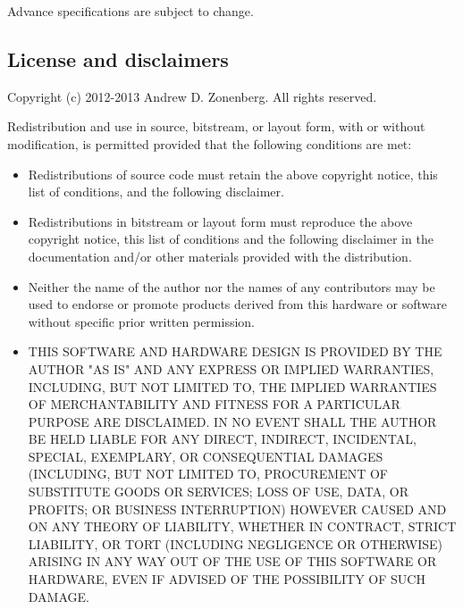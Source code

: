\documentclass{article}
\begin{document}
Advance specifications are subject to change.

\subsection{License and disclaimers}
                                                                                                                   
Copyright (c) 2012-2013 Andrew D. Zonenberg. All rights reserved.

Redistribution and use in source, bitstream, or layout form, with or without modification, is permitted
provided that the following conditions are met:

\begin{itemize}
\item Redistributions of source code must retain the above copyright notice, this list of conditions, and the following
disclaimer.

\item Redistributions in bitstream or layout form must reproduce the above copyright notice, this list of conditions and
the following disclaimer in the documentation and/or other materials provided with the distribution.

\item Neither the name of the author nor the names of any contributors may be used to endorse or promote products
derived from this hardware or software without specific prior written permission.

\item THIS SOFTWARE AND HARDWARE DESIGN IS PROVIDED BY THE AUTHOR "AS IS" AND ANY EXPRESS OR IMPLIED WARRANTIES, 
INCLUDING, BUT NOT LIMITED TO, THE IMPLIED WARRANTIES OF MERCHANTABILITY AND FITNESS FOR A PARTICULAR PURPOSE ARE 
DISCLAIMED. IN NO EVENT SHALL THE AUTHOR BE HELD LIABLE FOR ANY DIRECT, INDIRECT, INCIDENTAL, SPECIAL, EXEMPLARY, OR 
CONSEQUENTIAL DAMAGES (INCLUDING, BUT NOT LIMITED TO, PROCUREMENT OF SUBSTITUTE GOODS OR SERVICES; LOSS OF USE, 
DATA, OR PROFITS; OR BUSINESS INTERRUPTION) HOWEVER CAUSED AND ON ANY THEORY OF LIABILITY, WHETHER IN CONTRACT, 
STRICT LIABILITY, OR TORT (INCLUDING NEGLIGENCE OR OTHERWISE) ARISING IN ANY WAY OUT OF THE USE OF THIS SOFTWARE OR 
HARDWARE, EVEN IF ADVISED OF THE POSSIBILITY OF SUCH DAMAGE.

\end{itemize}
\end{document}
